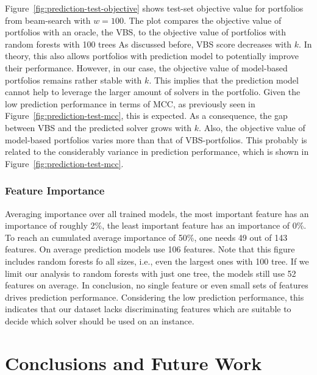 \documentclass[conference]{IEEEtran}
\begin{document}
Figure~\ref{fig:prediction-test-objective} shows test-set objective value for portfolios from beam-search with $w=100$.
The plot compares the objective value of portfolios with an oracle, the VBS, to the objective value of portfolios with random forests with 100 trees
As discussed before, VBS score decreases with $k$.
In theory, this also allows portfolios with prediction model to potentially improve their performance.
However, in our case, the objective value of model-based portfolios remains rather stable with $k$.
This implies that the prediction model cannot help to leverage the larger amount of solvers in the portfolio.
Given the low prediction performance in terms of MCC, as previously seen in Figure~\ref{fig:prediction-test-mcc}, this is expected.
As a consequence, the gap between VBS and the predicted solver grows with $k$.
Also, the objective value of model-based portfolios varies more than that of VBS-portfolios.
This probably is related to the considerably variance in prediction performance, which is shown in Figure~\ref{fig:prediction-test-mcc}.

\subsubsection{Feature Importance}

Averaging importance over all trained models, the most important feature has an importance of roughly 2\%, the least important feature has an importance of 0\%.
To reach an cumulated average importance of 50\%, one needs 49 out of 143 features.
On average prediction models use 106 features.
Note that this figure includes random forests fo all sizes, i.e., even the largest ones with 100 tree.
If we limit our analysis to random forests with just one tree, the models still use 52 features on average.
In conclusion, no single feature or even small sets of features drives prediction performance.
Considering the low prediction performance, this indicates that our dataset lacks discriminating features which are suitable to decide which solver should be used on an instance.

\section{Conclusions and Future Work}
\label{sec:conclusion}
\end{document}
